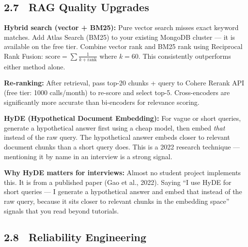\documentclass[11pt, a4paper]{article}
\DeclareRobustCommand{\badge}[2]{%
  \tikz[baseline=(n.base)]{
    \node[inner sep=3pt, rounded corners=3pt,
          fill=#1!15, text=#1!70!black,
          font=\fontsize{8}{8}\selectfont\bfseries] (n) {#2};
  }%
}
\DeclareRobustCommand{\high}{\badge{warning}{HIGH}}
\begin{document}
\subsection{2.7 \ RAG Quality Upgrades \hfill \high}

\begin{checklist}
  \item \textbf{Hybrid search (vector + BM25):} Pure vector search misses exact keyword matches. Add Atlas Search (BM25) to your existing MongoDB cluster — it is available on the free tier. Combine vector rank and BM25 rank using Reciprocal Rank Fusion: $\text{score} = \sum \frac{1}{k + \text{rank}}$ where $k=60$. This consistently outperforms either method alone.

  \item \textbf{Re-ranking:} After retrieval, pass top-20 chunks + query to Cohere Rerank API (free tier: 1000 calls/month) to re-score and select top-5. Cross-encoders are significantly more accurate than bi-encoders for relevance scoring.

  \item \textbf{HyDE (Hypothetical Document Embedding):} For vague or short queries, generate a hypothetical answer first using a cheap model, then embed \textit{that} instead of the raw query. The hypothetical answer embeds closer to relevant document chunks than a short query does. This is a 2022 research technique — mentioning it by name in an interview is a strong signal.
\end{checklist}

\begin{purplebox}
\textbf{Why HyDE matters for interviews:} Almost no student project implements this. It is from a published paper (Gao et al., 2022). Saying ``I use HyDE for short queries — I generate a hypothetical answer and embed that instead of the raw query, because it sits closer to relevant chunks in the embedding space'' signals that you read beyond tutorials.
\end{purplebox}

\subsection{2.8 \ Reliability Engineering \hfill \high}
\end{document}
